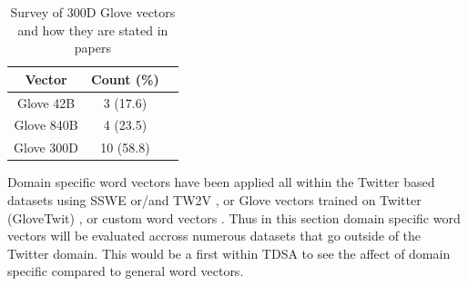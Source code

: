 \begin{table}[h!]
    \centering
    \begin{tabular}{|c|c|c|}
        \hline
        Vector & Count (\%)  \\
        \hline 
        Glove 42B & 3 (17.6)\\
        \hline 
        Glove 840B & 4 (23.5)\\
        \hline 
        Glove 300D & 10 (58.8)\\
        \hline
    \end{tabular}
    \caption{Survey of 300D Glove vectors and how they are stated in papers}
    \label{table:repro_survey_glove_vector_counts}
\end{table}

Domain specific word vectors have been applied all within the Twitter based datasets \citep{repro_margaret_2013,repro_dong_2014,repro_wang_2017} using SSWE or/and TW2V \citep{repro_vo_2015,repro_tang_2016,repro_zhang_2016,repro_wang_2017}, or Glove vectors trained on Twitter (GloveTwit) \citep{repro_tang_2016}, or custom word vectors \citep{repro_zhang_2015}. Thus in this section domain specific word vectors will be evaluated accross numerous datasets that go outside of the Twitter domain. This would be a first within TDSA to see the affect of domain specific compared to general word vectors.\\


